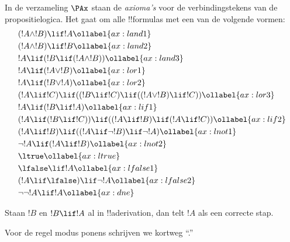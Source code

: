\documentclass[../../../include/open-logic-section]{subfiles}
\begin{document}
      {}
      {}


\begin{defn}[Axioma's]
In de verzameling $\PAx$ staan de \emph{axioma's} voor de
verbindingstekens van de propositielogica. Het gaat om alle
!!{formula}s met een van de volgende vormen:
\begin{align}
  & (!A \land !B) \lif !A \ollabel{ax:land1}\\
  & (!A \land !B) \lif !B \ollabel{ax:land2}\\
  & !A \lif (!B \lif (!A \land !B)) \ollabel{ax:land3}\\
  & !A \lif (!A \lor !B) \ollabel{ax:lor1}\\
  & !A \lif (!B \lor !A) \ollabel{ax:lor2}\\
  & (!A \lif !C) \lif ((!B \lif !C) \lif ((!A \lor !B) \lif !C)) \ollabel{ax:lor3}\\
  & !A \lif (!B \lif !A) \ollabel{ax:lif1}\\
  & (!A \lif (!B \lif !C)) \lif ((!A \lif !B) \lif (!A \lif !C)) \ollabel{ax:lif2}\\
  & (!A \lif !B) \lif ((!A \lif \lnot !B) \lif \lnot !A) \ollabel{ax:lnot1}\\
  & \lnot !A \lif (!A \lif !B) \ollabel{ax:lnot2}\\
  & \ltrue \ollabel{ax:ltrue}\\
  & \lfalse \lif !A \ollabel{ax:lfalse1}\\
  & (!A \lif \lfalse) \lif \lnot !A \ollabel{ax:lfalse2}\\
  & \lnot\lnot !A \lif !A \ollabel{ax:dne}
\end{align}
\end{defn}

\begin{defn}
  Staan $!B$ en $!B \lif !A$ al in !!a{derivation}, dan telt $!A$ als
  een correcte stap.
\end{defn}

Voor de regel modus ponens schrijven we kortweg ``\MP.''
\end{document}
